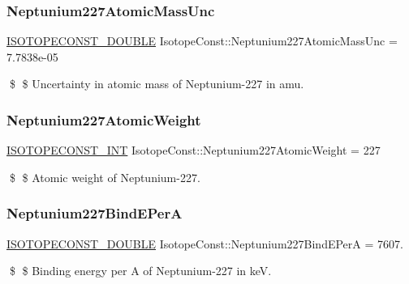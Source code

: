 \subsubsection{\texorpdfstring{Neptunium227\+Atomic\+Mass\+Unc}{Neptunium227AtomicMassUnc}}
{\footnotesize\ttfamily \mbox{\hyperlink{group___isotope_const-_macros_ga8f45a7272ce02c0b4c65c44636ed719a}{I\+S\+O\+T\+O\+P\+E\+C\+O\+N\+S\+T\+\_\+\+D\+O\+U\+B\+LE}} Isotope\+Const\+::\+Neptunium227\+Atomic\+Mass\+Unc = 7.\+7838e-\/05}

\$ \$ Uncertainty in atomic mass of Neptunium-\/227 in amu. \mbox{\label{group___isotope_const-_neptunium-_np227_ga7c8313ab54fb4069b14f7b35d08713e8}} 
\subsubsection{\texorpdfstring{Neptunium227\+Atomic\+Weight}{Neptunium227AtomicWeight}}
{\footnotesize\ttfamily \mbox{\hyperlink{group___isotope_const-_macros_ga5f18360b3e99483a35c32d789e62621c}{I\+S\+O\+T\+O\+P\+E\+C\+O\+N\+S\+T\+\_\+\+I\+NT}} Isotope\+Const\+::\+Neptunium227\+Atomic\+Weight = 227}

\$ \$ Atomic weight of Neptunium-\/227. \mbox{\label{group___isotope_const-_neptunium-_np227_ga9c1a80eceda78c648203437b9a847d81}} 
\subsubsection{\texorpdfstring{Neptunium227\+Bind\+E\+PerA}{Neptunium227BindEPerA}}
{\footnotesize\ttfamily \mbox{\hyperlink{group___isotope_const-_macros_ga8f45a7272ce02c0b4c65c44636ed719a}{I\+S\+O\+T\+O\+P\+E\+C\+O\+N\+S\+T\+\_\+\+D\+O\+U\+B\+LE}} Isotope\+Const\+::\+Neptunium227\+Bind\+E\+PerA = 7607.}

\$ \$ Binding energy per A of Neptunium-\/227 in keV. \mbox{\label{group___isotope_const-_neptunium-_np227_ga92da7ebaa21d87480c5e61acba155df7}} 

